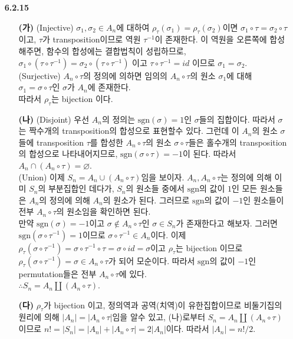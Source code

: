 \documentclass{article}
\begin{document}
\begin{itemize}
\item[\textbf{6.2.15}] 
	\begin{enumerate}
		\item[\textbf{(가)}] (Injective) $\sigma_1, \sigma_2 \in A_n$에 대하여 $\rho_\tau (\sigma_1) = \rho_\tau (\sigma_2)$이면 $\sigma_1 \circ \tau = \sigma_2\circ\tau$ 이고, $\tau$가 transposition이므로 역원 $\tau^{-1}$이 존재한다. 이 역원을 오른쪽에 합성해주면, 함수의 합성에는 결합법칙이 성립하므로, $\sigma_1 \circ (\tau \circ \tau^{-1}) = \sigma_2 \circ (\tau \circ \tau^{-1})$ 이고 $\tau \circ \tau^{-1} = id$ 이므로 $\sigma_1 = \sigma_2$. \\
		(Surjective) $A_n \circ \tau$의 정의에 의하면 임의의 $A_n \circ \tau$의 원소 $\sigma_1$에 대해 $\sigma_1 = \sigma \circ \tau$인 $\sigma$가 $A_n$에 존재한다.\\
		따라서 $\rho_\tau$는 bijection 이다.
		\item[\textbf{(나)}] (Disjoint) 우선 $A_n$의 정의는 $\mathrm{sgn}(\sigma) = 1$인 $\sigma$들의 집합이다. 따라서 $\sigma$는 짝수개의 transposition의 합성으로 표현할수 있다. 그런데 이 $A_n$의 원소 $\sigma$들에 transposition $\tau$를 합성한 $A_n \circ \tau$의 원소 $\sigma \circ \tau$들은 홀수개의 transposition의 합성으로 나타내어지므로, $\mathrm{sgn}(\sigma \circ \tau) = -1$이 된다. 따라서 $A_n \cap (A_n\circ\tau) = \varnothing$. \\
		(Union) 이제 $S_n = A_n \cup (A_n\circ\tau)$임을 보이자. $A_n, A_n\circ\tau$는 정의에 의해 이미 $S_n$의 부분집합인 데다가, $S_n$의 원소들 중에서 $\mathrm{sgn}$의 값이 $1$인 모든 원소들은 $A_n$의 정의에 의해 $A_n$의 원소가 된다. 그러므로 $\mathrm{sgn}$의 값이 $-1$인 원소들이 전부 $A_n\circ\tau$의 원소임을 확인하면 된다.\\ 만약 $\mathrm{sgn}(\sigma)=-1$이고 $\sigma \notin A_n\circ\tau$인 $\sigma \in S_n$가 존재한다고 해보자. 그러면 $\mathrm{sgn}(\sigma\circ\tau^{-1})=1$이므로 $\sigma\circ\tau^{-1}\in A_n$이다. 이제 $\rho_\tau(\sigma\circ\tau^{-1}) = \sigma\circ\tau^{-1}\circ\tau=\sigma\circ id = \sigma$이고 $\rho_\tau$는 bijection 이므로 $\rho_\tau(\sigma\circ\tau^{-1}) = \sigma \in A_n\circ\tau$가 되어 모순이다. 따라서 $\mathrm{sgn}$의 값이 $-1$인 permutation들은 전부 $A_n\circ\tau$에 있다. \\ $\therefore S_n = A_n \amalg (A_n\circ\tau)$.
		\item[\textbf{(다)}] $\rho_\tau$가 bijection 이고, 정의역과 공역(치역)이 유한집합이므로 비둘기집의 원리에 의해 $\left|A_n\right| = \left|A_n\circ\tau\right|$임을 알수 있고, (나)로부터 $S_n = A_n \amalg (A_n\circ\tau)$ 이므로 $n! = \left|S_n\right| = \left|A_n\right| + \left|A_n\circ\tau\right| = 2 \left|A_n\right|$이다. 따라서 $\left|A_n\right| = n!/2$.
		\end{enumerate}
		

\end{itemize}
\end{document}
